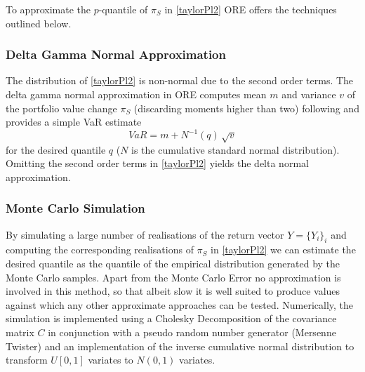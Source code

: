 \documentclass[12pt, a4paper]{article}
\begin{document}
\begin{appendix}
To approximate the $p$-quantile of $\pi_S$ in \eqref{taylorPl2} ORE offers the techniques outlined below.

\subsubsection*{Delta Gamma Normal Approximation}
 
The distribution of \eqref{taylorPl2} is non-normal due to the second order terms. 
The delta gamma normal approximation in ORE computes mean $m$ and variance $v$ of the portfolio value change $\pi_S$ (discarding moments higher than two) following \cite{alexander} and provides a simple VaR estimate 
$$
VaR = m + N^{-1}(q)\,\sqrt{v}
$$
for the desired quantile $q$ ($N$ is the cumulative standard normal distribution). Omitting the second order terms in \eqref{taylorPl2} yields the delta normal approximation.
 
\subsubsection*{Monte Carlo Simulation}

By simulating a large number of realisations of the return vector $Y=\{ Y_i \}_i$ and computing the corresponding
realisations of $\pi_S$ in \eqref{taylorPl2} we can estimate the desired quantile as the quantile of the empirical
distribution generated by the Monte Carlo samples. Apart from the Monte Carlo Error no approximation is involved in this
method, so that albeit slow it is well suited to produce values against which any other approximate approaches can be tested. Numerically, the simulation is implemented using a Cholesky Decomposition
of the covariance matrix $C$ in conjunction with a pseudo random number generator (Mersenne Twister) and an
implementation of the inverse cumulative normal distribution to transform $U[0,1]$ variates to $N(0,1)$ variates.

\end{appendix}

\end{document}
